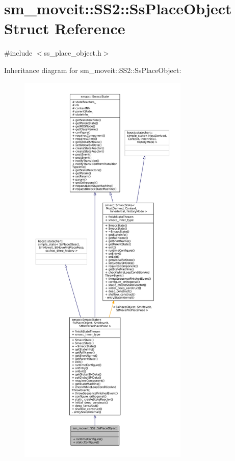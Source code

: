 \hypertarget{structsm__moveit_1_1SS2_1_1SsPlaceObject}{}\section{sm\+\_\+moveit\+:\+:S\+S2\+:\+:Ss\+Place\+Object Struct Reference}
\label{structsm__moveit_1_1SS2_1_1SsPlaceObject}


{\ttfamily \#include $<$ss\+\_\+place\+\_\+object.\+h$>$}



Inheritance diagram for sm\+\_\+moveit\+:\+:S\+S2\+:\+:Ss\+Place\+Object\+:
\nopagebreak
\begin{figure}[H]
\begin{center}
\leavevmode
\includegraphics[height=550pt]{structsm__moveit_1_1SS2_1_1SsPlaceObject__inherit__graph}
\end{center}
\end{figure}


